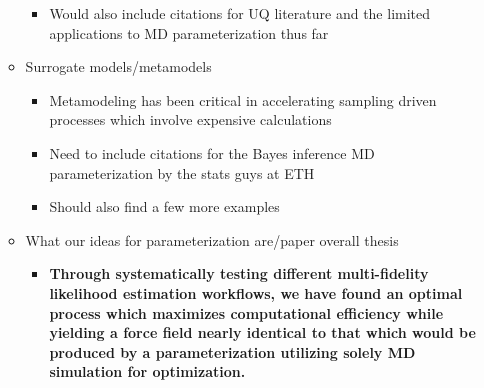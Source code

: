 \documentclass[aps,pre,nofootinbib,superscriptaddress,linenumbers,10pt, draft,tightenlines]{revtex4-1}
\begin{document}
\begin{itemize}
\begin{itemize}
\begin{itemize}
    		      \cite{bayes1,bayes2,bayes3,bayes4,bayes5,bayes6,bayes7,bayes8,bayes_coarse} 
    		\item Would also include citations for UQ literature and the limited applications to MD parameterization thus far
    	\end{itemize}
        \item Surrogate models/metamodels
        \begin{itemize}
        	\item Metamodeling has been critical in accelerating sampling driven processes which involve expensive calculations \cite{mbar}
        	\item Need to include citations for the Bayes inference MD parameterization by the stats guys at ETH
    	    \item Should also find a few more examples
        \end{itemize}    
        \item What our ideas for parameterization are/paper overall thesis
        \begin{itemize}
        	\item \textbf{Through systematically testing different multi-fidelity likelihood estimation workflows, we have found an optimal process which 
        	      maximizes computational efficiency while yielding a force field nearly identical to that which would be produced
        	      by a parameterization utilizing solely MD simulation for optimization.}
        \end{itemize}    
    \end{itemize}
\end{itemize}
\end{document}

